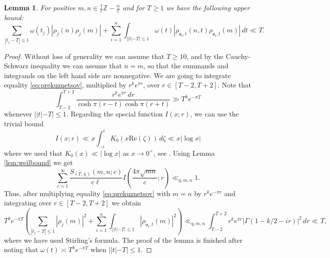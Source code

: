 \documentclass{article}
\newtheorem{lem}[thm]{Lemma}
\theoremstyle{named}
\newcommand{\Z}{\mathbb{Z}}
\renewcommand{\a}{\mathfrak{a}}
\begin{document}
\begin{lem}\label{lem:upperboundfouriercoefficients}
For positive $m,n \in \frac{1}{\ell}\Z - \frac{\alpha}{\ell}$ and for $T \geq 1$ we have the following upper bound:
\begin{equation*}
    \sum_{|t_j - T|\leq 1}\omega(t_j)|\rho_j(n)\rho_j(m)| + \sum_{i = 1}^\kappa\int_{||t|-T|\leq 1}\omega(t) |\rho_{\a_i, t}(n, t)\rho_{\a_i, t}(m)| \, dt \ll T.
\end{equation*}
\end{lem}

\begin{proof}
Without loss of generality we can assume that $T \geq 10$, and by the Cauchy-Schwarz inequality we can assume that $n = m$, so that the summands and integrands on the left hand side are nonnegative. We are going to integrate equality \eqref{eq:prekuznetsov}, multiplied by $r^k e^{\pi r}$, over $r \in [T-2, T + 2]$.
Note that 
\begin{equation}\label{eq:auxiliarylowerboundweights}
    \int_{T-2}^{T + 2}\frac{r^k e^{\pi r}\, dr}{\cosh \pi (r - t)\cosh\pi (r + t)} \gg T^k e^{-\pi T}
\end{equation}
whenever $||t|-T| \leq 1$. Regarding the special function $I(x; r)$, we can use the trivial bound 
\begin{equation*}
    I(x; r) \ll x \int_{-i}^{i}K_0(x\text{Re}(\zeta))\, d\zeta \ll x |\log x|
\end{equation*}
where we used that $K_0(x) \ll |\log x|$ as $x \to 0^+$, see \cite[\href{https://dlmf.nist.gov/10.31.E2}{(10.31.2)}]{dlmf}. Using Lemma \ref{lem:weilbound} we get 
\begin{equation*}
\sum_{c = 1}^\infty \frac{S_{(\Gamma, \chi)}(m, n; c)}{c\ell}I\left(\frac{4\pi \sqrt{m n}}{c}; r\right) \ll_{q, m, n} 1.    
\end{equation*}
Thus, after multiplying equality \eqref{eq:prekuznetsov} with $m = n$ by $r^k e^{-\pi r}$ and integrating over $r \in[T-2, T + 2]$ we obtain
\begin{equation*}
T^k e^{-\pi T}\left(\sum_{|t_j - T|\leq 1}|\rho_j(m)|^2 + \sum_{i = 1}^\kappa \int_{||t|-T|\leq 1} |\rho_{\a_i, t}(m)|^2\right) \ll_{q, m, n} \int_{T - 2}^{T + 2}r^k e^{\pi r} |\Gamma(1 - k/2 -ir)|^2 \, dr \ll T,
\end{equation*}
where we have used Stirling's formula. The proof of the lemma is finished after noting that $\omega(t) \asymp T^k e^{-\pi T}$ when $||t|-T|\leq 1$.
\end{proof}
\end{document}
